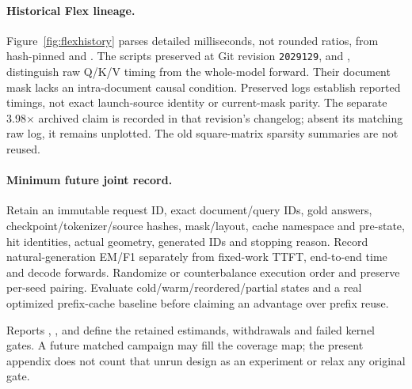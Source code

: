 \paragraph{Historical Flex lineage.}
Figure~\ref{fig:flexhistory} parses detailed milliseconds, not rounded ratios,
from hash-pinned  and
. The scripts preserved at Git revision
\texttt{2029129},  and
, distinguish raw Q/K/V timing from the
whole-model forward. Their document mask lacks an intra-document causal
condition. Preserved logs establish reported timings, not exact launch-source
identity or current-mask parity. The separate 3.98$\times$ archived claim is
recorded in that revision's changelog; absent its matching raw log, it remains
unplotted. The old square-matrix sparsity summaries are not reused.

\paragraph{Minimum future joint record.}
Retain an immutable request ID, exact document/query IDs, gold answers,
checkpoint/tokenizer/source hashes, mask/layout, cache namespace and pre-state,
hit identities, actual geometry, generated IDs and stopping reason. Record
natural-generation EM/F1 separately from fixed-work TTFT, end-to-end time and
decode forwards. Randomize or counterbalance execution order and preserve
per-seed pairing. Evaluate cold/warm/reordered/partial states and a real
optimized prefix-cache baseline before claiming an advantage over prefix reuse.

Reports , ,
 and  define the retained
estimands, withdrawals and failed kernel gates. A future matched campaign may
fill the coverage map; the present appendix does not count that unrun design
as an experiment or relax any original gate.
